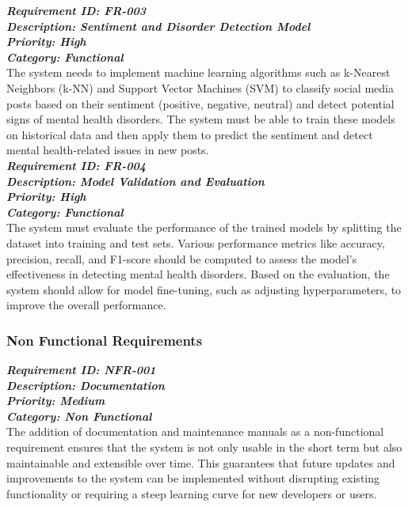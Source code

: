 \noindent
\textbf{\emph{Requirement ID: FR-003}} \\ 
\textbf{\emph{Description: Sentiment and Disorder Detection Model}} \\
\textbf{\emph{Priority: High}} \\
\textbf{\emph{Category: Functional}} \\
\noindent
The system needs to implement machine learning algorithms such as k-Nearest Neighbors (k-NN) and Support Vector Machines (SVM) to classify social media posts based on their sentiment (positive, negative, neutral) and detect potential signs of mental health disorders. The system must be able to train these models on historical data and then apply them to predict the sentiment and detect mental health-related issues in new posts. \\

\noindent
\textbf{\emph{Requirement ID: FR-004}} \\ 
\textbf{\emph{Description: Model Validation and Evaluation}} \\
\textbf{\emph{Priority: High}} \\
\textbf{\emph{Category: Functional}} \\
\noindent
The system must evaluate the performance of the trained models by splitting the dataset into training and test sets. Various performance metrics like accuracy, precision, recall, and F1-score should be computed to assess the model’s effectiveness in detecting mental health disorders. Based on the evaluation, the system should allow for model fine-tuning, such as adjusting hyperparameters, to improve the overall performance. 


\subsubsection{Non Functional Requirements}

\noindent
\textbf{\emph{Requirement ID: NFR-001}} \\ 
\textbf{\emph{Description: Documentation}} \\
\textbf{\emph{Priority: Medium}} \\
\textbf{\emph{Category: Non Functional}} \\
\noindent
The addition of documentation and maintenance manuals as a non-functional requirement ensures that the system is not only usable in the short term but also maintainable and extensible over time. This guarantees that future updates and improvements to the system can be implemented without disrupting existing functionality or requiring a steep learning curve for new developers or users. \\

